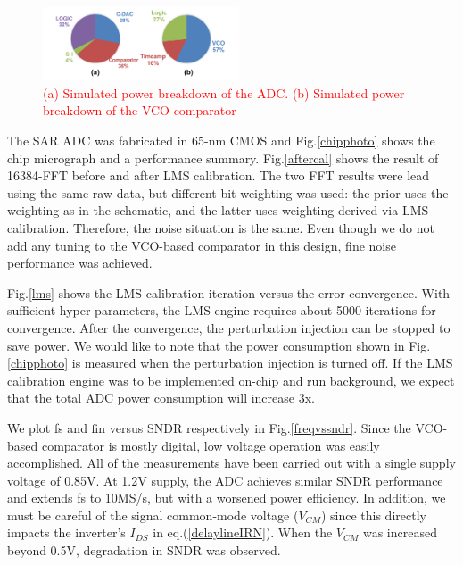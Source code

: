\documentclass[journal]{IEEEtran}
\begin{document}
\begin{figure}[!t]
\centering
 \includegraphics[width=0.52\textwidth]{figs/breakdown.png}
 \caption{\textcolor{red}{(a) Simulated power breakdown of the ADC. (b) Simulated power breakdown of the VCO comparator}}
  \label{power}
\end{figure}

The SAR ADC was fabricated in 65-nm CMOS and Fig.\ref{chipphoto} shows the chip micrograph and a performance summary. 
Fig.\ref{aftercal} shows the result of 16384-FFT before and after LMS calibration. The two FFT results were lead using the same raw data, but different bit weighting was used: the prior uses the weighting as in the schematic, and the latter uses weighting derived via LMS calibration. Therefore, the noise situation is the same. Even though we do not add any tuning to the VCO-based comparator in this design, fine noise performance was achieved. 

Fig.\ref{lms} shows the LMS calibration iteration versus the error convergence. With sufficient hyper-parameters, the LMS engine requires about 5000 iterations for convergence. After the convergence, the perturbation injection can be stopped to save power. 
We would like to note that the power consumption shown in Fig.\ref{chipphoto} is measured when the perturbation injection is turned off. If the LMS calibration engine was to be implemented on-chip and run background, we expect that the total ADC power consumption will increase 3x. 

We plot fs and fin versus SNDR respectively in Fig.\ref{freqvssndr}. Since the VCO-based comparator is mostly digital, low voltage operation was easily accomplished. All of the measurements have been carried out with a single supply voltage of 0.85V. At 1.2V supply, the ADC achieves similar SNDR performance and extends fs to 10MS/s, but with a worsened power efficiency. In addition, we must be careful of the signal common-mode voltage ($V_{CM}$) since this directly impacts the inverter’s $I_{DS}$ in eq.(\ref{delaylineIRN}). When the $V_{CM}$ was increased beyond 0.5V, degradation in SNDR was observed.
\end{document}

